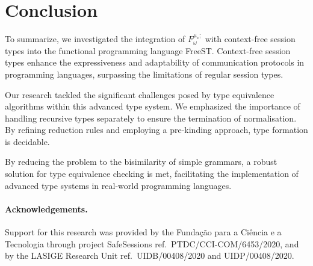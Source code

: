 \section{Conclusion}\label{sec:conclusion}
To summarize, we investigated the integration of  $F^{\mu_*;}_\omega$ with context-free session types into the functional programming language FreeST. Context-free session types enhance the expressiveness and adaptability of communication protocols in programming languages, surpassing the limitations of regular session types. 

Our research tackled the significant challenges posed by type equivalence algorithms within this advanced type system. We emphasized the importance of handling recursive types separately to ensure the termination of normalisation. By refining reduction rules and employing a pre-kinding approach, type formation is decidable.

By reducing the problem to the bisimilarity of simple grammars, a robust solution for type equivalence checking is met, facilitating the implementation of advanced type systems in real-world programming languages.
\medskip

\paragraph{Acknowledgements.}
  Support for this research was provided by the Fundação para a Ciência e a
  Tecnologia through project SafeSessions ref.\ PTDC/CCI-COM/6453/2020, and by the
  LASIGE Research Unit ref.\ UIDB/00408/2020
  and UIDP/00408/2020.

